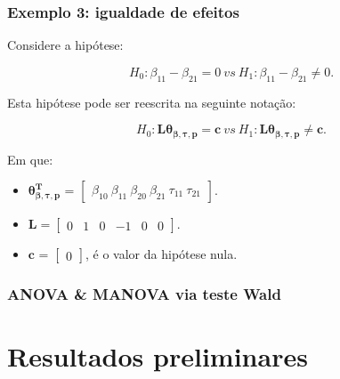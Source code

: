 \documentclass[10pt,
  aspectratio=169,
  serif,
  mathserif,
  professionalfont,
  compress,
  handout,
  ]{beamer}\usepackage[]{graphicx}\usepackage[]{color}
\begin{document}

\begin{frame}

\frametitle{Exemplo 3: igualdade de efeitos}

Considere a hipótese:

$$H_0: \beta_{11} - \beta_{21} = 0 \ vs \ H_1: \beta_{11} - \beta_{21} \neq 0.$$

Esta hipótese pode ser reescrita na seguinte notação:

$$H_0: \boldsymbol{L}\boldsymbol{\theta_{\beta,\tau,p}} = \boldsymbol{c} \ vs \ H_1: \boldsymbol{L}\boldsymbol{\theta_{\beta,\tau,p}} \neq \boldsymbol{c}.$$ 

Em que:

\begin{itemize}
  
  \item $\boldsymbol{\theta_{\beta,\tau,p}^T}$ = $\begin{bmatrix} \beta_{10} \  \beta_{11} \ \beta_{20} \ \beta_{21} \ \tau_{11} \ \tau_{21} \end{bmatrix}$.


\item $\boldsymbol{L} = \begin{bmatrix} 0 & 1 & 0 & -1 & 0 & 0  \end{bmatrix}.$
 
\item $\boldsymbol{c}$ = $\begin{bmatrix} 0 \end{bmatrix}$, é o valor da hipótese nula. 

\end{itemize}

\end{frame}


\begin{frame}

\frametitle{ANOVA \& MANOVA via teste Wald}



\end{frame}


\section{Resultados preliminares}
\end{document}
